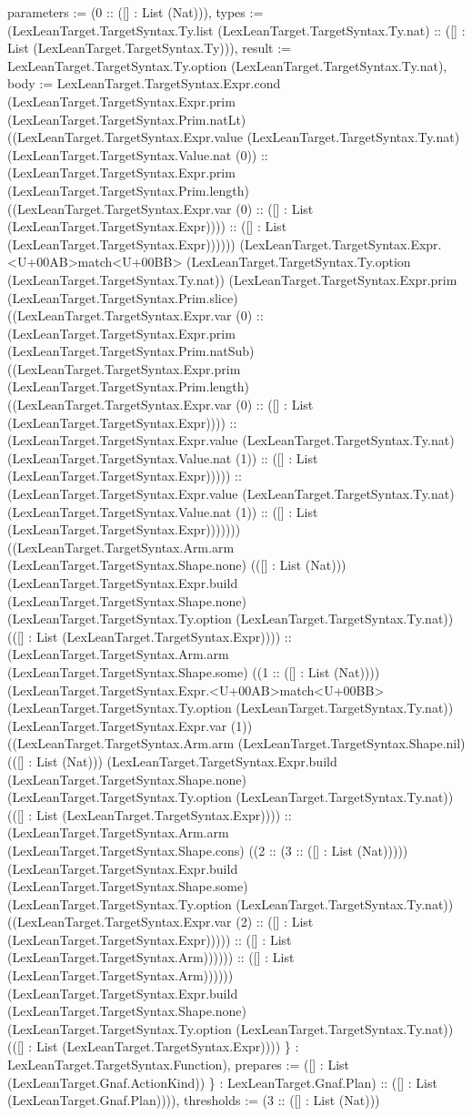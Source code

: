 \documentclass[11pt]{article}
\begin{document}
parameters := (0 :: ([] : List (Nat))), types := (LexLeanTarget.TargetSyntax.Ty.list (LexLeanTarget.TargetSyntax.Ty.nat) :: ([] : List (LexLeanTarget.TargetSyntax.Ty))), result := LexLeanTarget.TargetSyntax.Ty.option (LexLeanTarget.TargetSyntax.Ty.nat), body := LexLeanTarget.TargetSyntax.Expr.cond (LexLeanTarget.TargetSyntax.Expr.prim (LexLeanTarget.TargetSyntax.Prim.natLt) ((LexLeanTarget.TargetSyntax.Expr.value (LexLeanTarget.TargetSyntax.Ty.nat) (LexLeanTarget.TargetSyntax.Value.nat (0)) :: (LexLeanTarget.TargetSyntax.Expr.prim (LexLeanTarget.TargetSyntax.Prim.length) ((LexLeanTarget.TargetSyntax.Expr.var (0) :: ([] : List (LexLeanTarget.TargetSyntax.Expr)))) :: ([] : List (LexLeanTarget.TargetSyntax.Expr)))))) (LexLeanTarget.TargetSyntax.Expr.<U+00AB>match<U+00BB> (LexLeanTarget.TargetSyntax.Ty.option (LexLeanTarget.TargetSyntax.Ty.nat)) (LexLeanTarget.TargetSyntax.Expr.prim (LexLeanTarget.TargetSyntax.Prim.slice) ((LexLeanTarget.TargetSyntax.Expr.var (0) :: (LexLeanTarget.TargetSyntax.Expr.prim (LexLeanTarget.TargetSyntax.Prim.natSub) ((LexLeanTarget.TargetSyntax.Expr.prim (LexLeanTarget.TargetSyntax.Prim.length) ((LexLeanTarget.TargetSyntax.Expr.var (0) :: ([] : List (LexLeanTarget.TargetSyntax.Expr)))) :: (LexLeanTarget.TargetSyntax.Expr.value (LexLeanTarget.TargetSyntax.Ty.nat) (LexLeanTarget.TargetSyntax.Value.nat (1)) :: ([] : List (LexLeanTarget.TargetSyntax.Expr))))) :: (LexLeanTarget.TargetSyntax.Expr.value (LexLeanTarget.TargetSyntax.Ty.nat) (LexLeanTarget.TargetSyntax.Value.nat (1)) :: ([] : List (LexLeanTarget.TargetSyntax.Expr))))))) ((LexLeanTarget.TargetSyntax.Arm.arm (LexLeanTarget.TargetSyntax.Shape.none) (([] : List (Nat))) (LexLeanTarget.TargetSyntax.Expr.build (LexLeanTarget.TargetSyntax.Shape.none) (LexLeanTarget.TargetSyntax.Ty.option (LexLeanTarget.TargetSyntax.Ty.nat)) (([] : List (LexLeanTarget.TargetSyntax.Expr)))) :: (LexLeanTarget.TargetSyntax.Arm.arm (LexLeanTarget.TargetSyntax.Shape.some) ((1 :: ([] : List (Nat)))) (LexLeanTarget.TargetSyntax.Expr.<U+00AB>match<U+00BB> (LexLeanTarget.TargetSyntax.Ty.option (LexLeanTarget.TargetSyntax.Ty.nat)) (LexLeanTarget.TargetSyntax.Expr.var (1)) ((LexLeanTarget.TargetSyntax.Arm.arm (LexLeanTarget.TargetSyntax.Shape.nil) (([] : List (Nat))) (LexLeanTarget.TargetSyntax.Expr.build (LexLeanTarget.TargetSyntax.Shape.none) (LexLeanTarget.TargetSyntax.Ty.option (LexLeanTarget.TargetSyntax.Ty.nat)) (([] : List (LexLeanTarget.TargetSyntax.Expr)))) :: (LexLeanTarget.TargetSyntax.Arm.arm (LexLeanTarget.TargetSyntax.Shape.cons) ((2 :: (3 :: ([] : List (Nat))))) (LexLeanTarget.TargetSyntax.Expr.build (LexLeanTarget.TargetSyntax.Shape.some) (LexLeanTarget.TargetSyntax.Ty.option (LexLeanTarget.TargetSyntax.Ty.nat)) ((LexLeanTarget.TargetSyntax.Expr.var (2) :: ([] : List (LexLeanTarget.TargetSyntax.Expr))))) :: ([] : List (LexLeanTarget.TargetSyntax.Arm)))))) :: ([] : List (LexLeanTarget.TargetSyntax.Arm)))))) (LexLeanTarget.TargetSyntax.Expr.build (LexLeanTarget.TargetSyntax.Shape.none) (LexLeanTarget.TargetSyntax.Ty.option (LexLeanTarget.TargetSyntax.Ty.nat)) (([] : List (LexLeanTarget.TargetSyntax.Expr)))) \} : LexLeanTarget.TargetSyntax.Function), prepares := ([] : List (LexLeanTarget.Gnaf.ActionKind)) \} : LexLeanTarget.Gnaf.Plan) :: ([] : List (LexLeanTarget.Gnaf.Plan)))), thresholds := (3 :: ([] : List (Nat))) 
\end{document}
